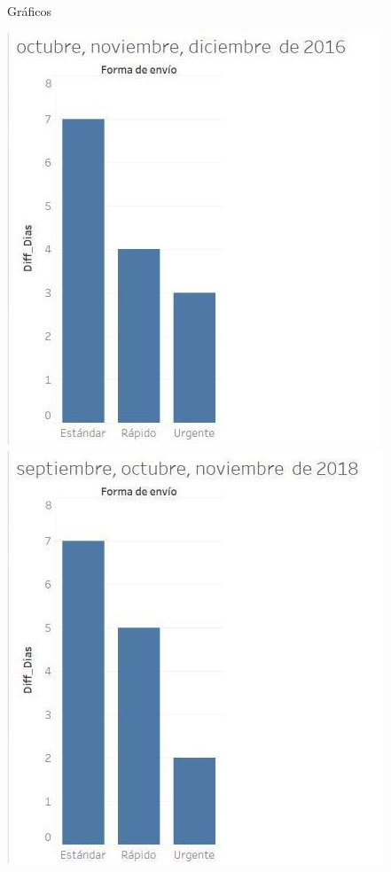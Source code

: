 \documentclass{beamer}
\begin{document}
\begin{frame}{Gráficos}

\begin{center}
\includegraphics[scale=0.5]{imagenes/TA2016.jpg}
\includegraphics[scale=0.5]{imagenes/TA2018.jpg} 
\end{center}
	
\end{frame}
\end{document}
